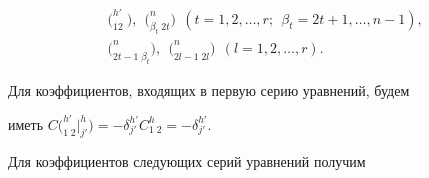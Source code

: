 \begin{align*} 


&\big(^{h'}_{12}\ \big), \ \ \big(^n_{\beta_t\; 2t}\big)\ \  


(t=1,2,\dotsc,r;\ \ \beta_t=2t+1,\dotsc,n-1), \\ 


&\big(^n_{2t-1\; \beta_t}\big), \ \ \big(^n_{2l-1\; 2l} \big) 


\ \ (l=1,2,\dotsc,r). 


\end{align*} 


Для коэффициентов, входящих в первую серию уравнений, будем 


иметь $C\big(^{h'}_{1\;2} \big|^h_{j'} \big)= -\delta^{h'}_{j'} 


C^h_{1\;2}=-\delta^{h'}_{j'}$. 


Для коэффициентов следующих серий уравнений получим 


